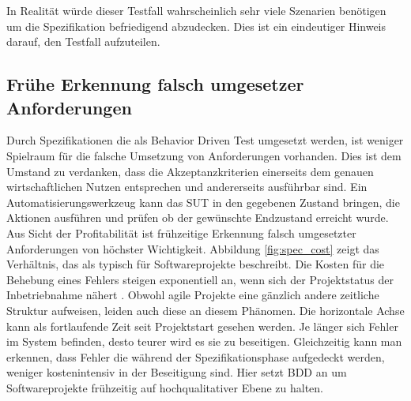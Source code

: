 In Realität würde dieser Testfall wahrscheinlich sehr viele Szenarien benötigen um die Spezifikation befriedigend abzudecken. Dies ist ein eindeutiger Hinweis darauf, den Testfall aufzuteilen.

\subsection{Frühe Erkennung falsch umgesetzer Anforderungen}
Durch Spezifikationen die als Behavior Driven Test umgesetzt werden, ist weniger Spielraum für die falsche Umsetzung von Anforderungen vorhanden. Dies ist dem Umstand zu verdanken, dass die Akzeptanzkriterien einerseits dem genauen wirtschaftlichen Nutzen entsprechen und andererseits ausführbar sind. Ein Automatisierungswerkzeug kann das \Gls{SUT} in den gegebenen Zustand bringen, die Aktionen ausführen und prüfen ob der gewünschte Endzustand erreicht wurde.\\
Aus Sicht der Profitabilität ist frühzeitige Erkennung falsch umgesetzter Anforderungen von höchster Wichtigkeit. Abbildung \ref{fig:spec_cost} zeigt das Verhältnis, das \citeauthor{boehm_software_1981} als typisch für Softwareprojekte beschreibt. Die Kosten für die Behebung eines Fehlers steigen exponentiell an, wenn sich der Projektstatus der Inbetriebnahme nähert \cite{boehm_software_1981}. Obwohl agile Projekte eine gänzlich andere zeitliche Struktur aufweisen, leiden auch diese an diesem Phänomen. Die horizontale Achse kann als fortlaufende Zeit seit Projektstart gesehen werden. Je länger sich Fehler im System befinden, desto teurer wird es sie zu beseitigen. Gleichzeitig kann man erkennen, dass Fehler die während der Spezifikationsphase aufgedeckt werden, weniger kostenintensiv in der Beseitigung sind. Hier setzt \Gls{BDD} an um Softwareprojekte frühzeitig auf hochqualitativer Ebene zu halten.

